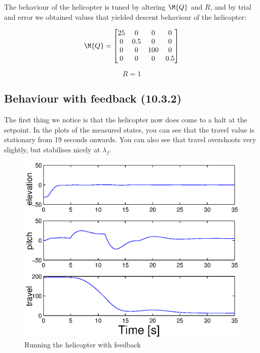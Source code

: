 The behaviour of the helicopter is tuned by altering $\M{Q}$ and $R$, and by trial and error we obtained values that yielded descent behaviour of the helicopter:

\begin{equation}
	\M{Q} = 
    \begin{bmatrix}
    	25 & 0 & 0 & 0 \\
        0 & 0.5 & 0 & 0 \\
        0 & 0 & 100 & 0 \\
        0 & 0 & 0 & 0.5
    \end{bmatrix}
\end{equation}

\begin{equation}
	R = 1
\end{equation}

\subsection{Behaviour with feedback (10.3.2)}

The first thing we notice is that the helicopter now does come to a halt at the setpoint. In the plots of the measured states, you can see that the travel value is stationary from 19 seconds onwards. You can also see that travel overshoots very slightly, but stabilises nicely at $\lambda_f$.

\begin{figure}[H]
	\centering
	\includegraphics[width=\textwidth]{day3}
	\caption{Running the helicopter with feedback}
	\label{fig:day3}
\end{figure}


